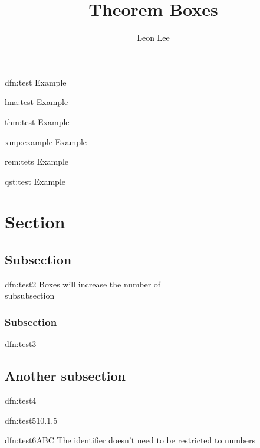 \documentclass[]{article}
\title{Theorem Boxes}
\author{Leon Lee}
\begin{document}
\maketitle

\begin{dfn}[Example]{dfn:test}{}
    Example
\end{dfn}

\begin{lma}[Example]{lma:test}{}
    Example
\end{lma}

\begin{thm}[Example]{thm:test}{}
    Example
\end{thm}

\begin{xmp}[Example]{xmp:example}{}
    Example
\end{xmp}

\begin{rem}[Example]{rem:tets}{}
    Example
\end{rem}

\begin{qst}[Example]{qst:test}{}
    Example
\end{qst}

\newpage

\section{Section}
\subsection{Subsection}
\begin{dfn}{dfn:test2}{}
    Boxes will increase the number of \\subsubsection
\end{dfn}

\subsubsection{Subsection}

\begin{dfn}{dfn:test3}{}
    
\end{dfn}

\subsection{Another subsection}

\begin{dfn}{dfn:test4}{}
    
\end{dfn}

\begin{dfn}{dfn:test5}{10.1.5}
    
\end{dfn}

\begin{dfn}{dfn:test6}{ABC}
    The identifier doesn't need to be restricted to numbers
\end{dfn}
\end{document}
